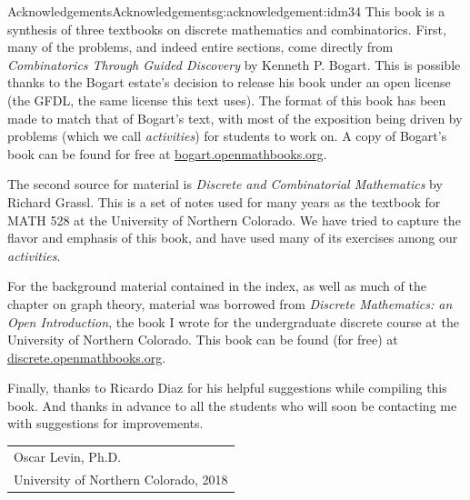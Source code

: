 \documentclass[oneside,10pt,]{book}
\numberwithin{equation}{chapter}
\begin{document}
\begin{acknowledgement}{Acknowledgements}{}{Acknowledgements}{}{}{g:acknowledgement:idm34}
This book is a synthesis of three textbooks on discrete mathematics and combinatorics.  First, many of the problems, and indeed entire sections, come directly from \textsl{Combinatorics Through Guided Discovery} by Kenneth P. Bogart.  This is possible thanks to the Bogart estate's decision to release his book under an open license (the GFDL, the same license this text uses).  The format of this book has been made to match that of Bogart's text, with most of the exposition being driven by problems (which we call \emph{activities}) for students to work on.  A copy of Bogart's book can be found for free at \href{http://bogart.openmathbooks.org/}{bogart.openmathbooks.org}.%
\par
The second source for material is \textsl{Discrete and Combinatorial Mathematics} by Richard Grassl.  This is a set of notes used for many years as the textbook for MATH 528 at the University of Northern Colorado.  We have tried to capture the flavor and emphasis of this book, and have used many of its exercises among our \emph{activities}.%
\par
For the background material contained in the index, as well as much of the chapter on graph theory, material was borrowed from \textsl{Discrete Mathematics: an Open Introduction}, the book I wrote for the undergraduate discrete course at the University of Northern Colorado.  This book can be found (for free) at \href{http://discrete.openmathbooks.org/}{discrete.openmathbooks.org}.%
\par
Finally, thanks to Ricardo Diaz for his helpful suggestions while compiling this book.  And thanks in advance to all the students who will soon be contacting me with suggestions for improvements.%
\nopagebreak\par%
\hfill\begin{tabular}[t]{l@{}}
Oscar Levin, Ph.D.\\
University of Northern Colorado, 2018
\end{tabular}\\\par
\end{acknowledgement}
%
%
\typeout{************************************************}
\typeout{************************************************}
%
\end{document}
